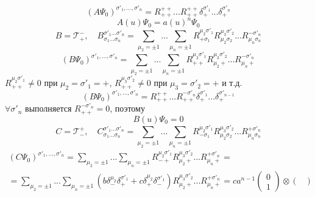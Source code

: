 \documentclass[12pt]{article}
\theoremstyle{definition}
\begin{document}
\begin{enumerate}
    \begin{equation}
        (A\Psi_0)^{\sigma'_1,...,\sigma'_n}=R^{++}_{++}...R^{++}_{++}\delta^{\sigma'_1}_+...\delta^{\sigma'_n}_+
    \end{equation}
    \begin{equation}
        \boxed{A(u)\Psi_0=a(u)^n\Psi_0}
    \end{equation}
    \begin{equation}
        B=\mathcal{T}^-_+,\quad B^{\sigma'_1...\sigma'_n}_{\sigma_1...\sigma_n}=\sum\limits_{\mu_2=\pm1}...\sum\limits_{\mu_n=\pm1}R^{\mu_2\sigma'_1}_{+\sigma_1}R^{\mu_3\sigma'_2}_{\mu_2\sigma_2}...R^{-\sigma'_n}_{\mu_n\sigma_n}
    \end{equation}
    \begin{equation}
        (B\Psi_0)^{\sigma'_1,...,\sigma'_n}=\sum\limits_{\mu_2=\pm1}...\sum\limits_{\mu_n=\pm1}R^{\mu_2\sigma'_1}_{++}R^{\mu_3\sigma'_2}_{\mu_2+}...R^{-\sigma'_n}_{\mu_n+}
    \end{equation}
    $R^{\mu_2\sigma'_1}_{++}\neq0$ при $\mu_2=\sigma'_1=+$, $R^{\mu_3\sigma'_2}_{++}\neq0$ при $\mu_3=\sigma'_2=+$ и т.д.
    \begin{equation}
        (B\Psi_0)^{\sigma'_1,...,\sigma'_n}=R^{++}_{++}...R^{-\sigma'_n}_{++}\delta^{\sigma'_1}_+...\delta^{\sigma'_{n-1}}_+
    \end{equation}
    $\forall\sigma'_n$ выполняется $R^{-\sigma'_n}_{++}=0$, поэтому
    \begin{equation}
        \boxed{B(u)\Psi_0=0}
    \end{equation}
    \begin{equation}
        C=\mathcal{T}^+_-,\quad C^{\sigma'_1...\sigma'_n}_{\sigma_1...\sigma_n}=\sum\limits_{\mu_2=\pm1}...\sum\limits_{\mu_n=\pm1}R^{\mu_2\sigma'_1}_{-\sigma_1}R^{\mu_3\sigma'_2}_{\mu_2\sigma_2}...R^{+\sigma'_n}_{\mu_n\sigma_n}
    \end{equation}
    \begin{multline}
        (C\Psi_0)^{\sigma'_1,...,\sigma'_n}=\sum\limits_{\mu_2=\pm1}...\sum\limits_{\mu_n=\pm1}R^{\mu_2\sigma'_1}_{-+}R^{\mu_3\sigma'_2}_{\mu_2+}...R^{+\sigma'_n}_{\mu_n+}=\\=\sum\limits_{\mu_2=\pm1}...\sum\limits_{\mu_n=\pm1}(b\delta^{\mu_2}_-\delta^{\sigma'_1}_++c\delta^{\mu_2}_+\delta^{\sigma'_1}_-)R^{\mu_3\sigma'_2}_{\mu_2+}...R^{+\sigma'_n}_{\mu_n+}=ca^{n-1}\begin{pmatrix}
            0\\
            1
        \end{pmatrix}\otimes\begin{pmatrix}

\end{pmatrix}
\end{multline}
\end{enumerate}
\end{document}
